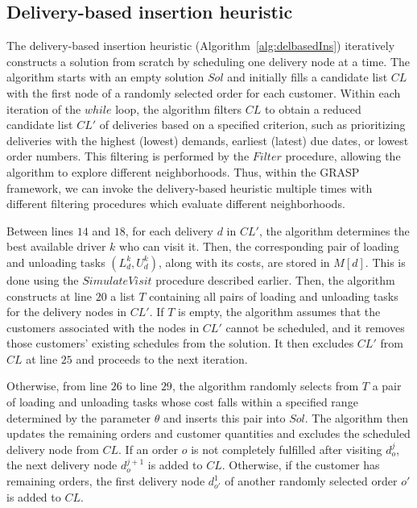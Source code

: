 \documentclass[]{article}
\begin{document}
\subsection{Delivery-based insertion heuristic}

The delivery-based insertion heuristic (Algorithm~\ref{alg:delbasedIns}) iteratively constructs a solution from scratch by scheduling one delivery node at a time. The algorithm starts with an empty solution $Sol$ and initially fills a candidate list $CL$ with the first node of a randomly selected order for each customer. Within each iteration of the $while$ loop, the algorithm filters $CL$ to obtain a reduced candidate list $CL'$ of deliveries based on a specified criterion, such as prioritizing deliveries with the highest (lowest) demands, earliest (latest) due dates, or lowest order numbers. This filtering is performed by the $Filter$ procedure, allowing the algorithm to explore different neighborhoods. Thus, within the GRASP framework, we can invoke the delivery-based heuristic multiple times with different filtering procedures which evaluate different neighborhoods. 

Between lines $14$ and $18$, for each delivery $d$ in $CL'$, the algorithm determines the best available driver $k$ who can visit it. Then, the corresponding pair of loading and unloading tasks $(L^k_d, U^k_d)$, along with its costs, are stored in $M[d]$. This is done using the $SimulateVisit$ procedure described earlier. Then, the algorithm constructs at line $20$ a list $T$ containing all pairs of loading and unloading tasks for the delivery nodes in $CL'$.
If $T$ is empty, the algorithm assumes that the customers associated with the nodes in $CL'$ cannot be scheduled, and it removes those customers' existing schedules from the solution. It then excludes $CL'$ from $CL$ at line $25$ and proceeds to the next iteration.

Otherwise, from line $26$ to line $29$, the algorithm randomly selects from $T$ a pair of loading and unloading tasks whose cost falls within a specified range determined by the parameter $\theta$ and inserts this pair into $Sol$. The algorithm then updates the remaining orders and customer quantities and excludes the scheduled delivery node from $CL$. If an order $o$ is not completely fulfilled after visiting $d^j_{o}$, the next delivery node $d^{j+1}_{o}$ is added to $CL$.  Otherwise, if the customer has remaining orders, the first delivery node $d^{1}_{o'}$ of another randomly selected order $o'$ is added to $CL$.
 
\end{document}
